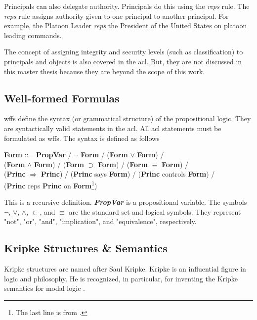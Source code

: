 \documentclass[../../main/main.tex]{subfiles}
\begin{document}
Principals can also delegate authority.  Principals do this using the \textit{reps} rule.  The \textit{reps} rule assigns authority given to one principal to another principal.  For example, the Platoon Leader \textit{reps} the President of the United States on platoon leading commands.

The concept of assigning integrity and security levels (such as classification) to principals and objects is also covered in the \gls{acl}.  But, they are not discussed in this master thesis because they are beyond the scope of this work.

\subsection{Well-formed Formulas}\label{ssec:wff}
\Glspl{wff} define the syntax (or grammatical structure) of the propositional logic.  They are syntactically valid statements in the \gls{acl}.  All \gls{acl} statements must be formulated as \glspl{wff}.  The syntax is defined as follows

\begin{center}\label{wffdef}
\textbf{Form} ::= \textbf{PropVar} / $\neg$ \textbf{Form} / (\textbf{Form} $\vee$ \textbf{Form}) / \\ 
	                  (\textbf{Form} $\wedge$ \textbf{Form}) / (\textbf{Form} $\supset$ \textbf{Form}) / (\textbf{Form} $\equiv$ \textbf{Form}) / \\
	                  (\textbf{Princ} $\Rightarrow$ \textbf{Princ}) / (\textbf{Princ} says \textbf{Form}) / (\textbf{Princ} controls \textbf{Form}) /\\
	                  (\textbf{Princ} reps \textbf{Princ} on \textbf{Form}\footnote{The last line is from \cite{certmanual}.})
\end{center}

This is a recursive definition.  \textbf{\textit{PropVar}} is a propositional variable.  The symbols $\neg$, $\vee$, $\wedge$, $\subset$, and $\equiv$ are the standard set and logical symbols.  They represent "not", "or", "and", "implication", and "equivalence", respectively.  

\subsection{Kripke Structures \& Semantics}\label{ssec:kripke}
Kripke structures are named after Saul Kripke.  Kripke is an influential figure in logic and philosophy.  He is recognized, in particular, for inventing the Kripke semantics for modal logic \cite{saulk}.    
\end{document}
